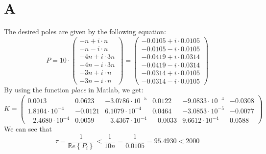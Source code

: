 \documentclass[11pt, a4paper]{article}
\begin{document}
\section{A}
The desired poles are given by the following equation:
\begin{equation}
    P = 10\cdot\begin{pmatrix}
        -n+i\cdot n\\-n-i\cdot n\\
        -4n+i\cdot 3n\\-4n-i\cdot 3n\\
        -3n+i\cdot n\\-3n-i\cdot n
    \end{pmatrix} = \begin{pmatrix}
        -0.0105+i\cdot0.0105\\ -0.0105-i\cdot0.0105\\
        -0.0419+i\cdot0.0314\\ -0.0419-i\cdot0.0314\\
        -0.0314+i\cdot0.0105\\ -0.0314-i\cdot0.0105
    \end{pmatrix}
\end{equation}
By using the function \emph{place} in Matlab, we get:
\begin{equation}
    K = \begin{pmatrix}
        0.0013&0.0623&-3.0786\cdot10^{-5}&0.0122&-9.0833\cdot10^{-4}&-0.0308\\
        1.8104\cdot10^{-4}&-0.0121&6.1079\cdot10^{-4}&0.0464&-3.0853\cdot10^{-5}&-0.0077\\
        -2.4680\cdot10^{-4}&0.0059&-3.4367\cdot10^{-4}&-0.0033&9.6612\cdot10^{-4}&0.0588
    \end{pmatrix}
\end{equation}
We can see that $$\displaystyle\tau = \frac{1}{\mathbb{R}e\left\{P_i\right\}} < \frac{1}{10n} = \frac{1}{0.0105} = 95.4930 < 2000$$
\end{document}
